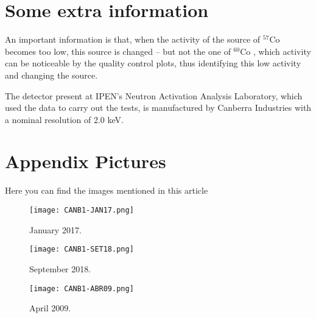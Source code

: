 \documentclass[fleqn,usenatbib]{rasti}
\begin{document}





\appendix

\section{Some extra information}

An important information is that, when the activity of the source of $^{57}$Co becomes too low, this source is changed – but not the one of $^{60}$Co \citep{zahn2017long}, which activity can be noticeable by the quality control plots, thus identifying this low activity and changing the source.

The detector present at IPEN's Neutron Activation Analysis Laboratory, which used the data to carry out the tests, is manufactured by Canberra Industries with a nominal resolution of 2.0 keV.

 


\section{Appendix Pictures}
Here you can find the images mentioned in this article
\\

\begin{figure}
 \centering
 \texttt{[image: CANB1-JAN17.png]}
 \caption{January 2017.}
 \label{fig:jan17}
\end{figure}
\begin{figure}[H]
  \centering
  \texttt{[image: CANB1-SET18.png]}
  \caption{September 2018.}
  \label{fig:set18}
\end{figure}

\begin{figure}[H]
  \centering
  \texttt{[image: CANB1-ABR09.png]}
  \caption{April 2009.}
  \label{fig:abr09}
\end{figure}
\end{document}

